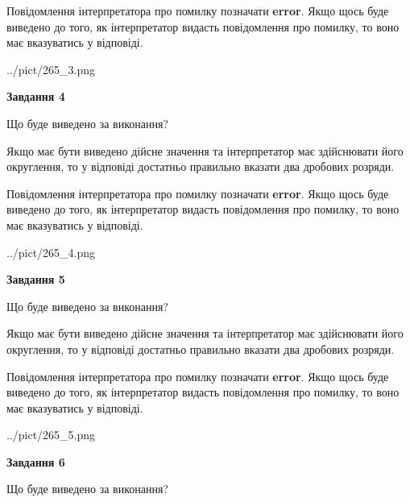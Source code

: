 \documentclass[12pt, ukrainian]{article}
\begin{document}
{\begin {Large}
Повідомлення інтерпретатора про помилку позначати \textbf{error}.
Якщо щось буде виведено до того, як інтерпретатор видасть повідомлення про помилку, 
то воно має вказуватись у відповіді. \par

\begin{center}
	{../pict/265_3.png}
\end{center}
\newpage

{\begin {center}\textbf{Завдання 4}\end {center}}\par
Що буде виведено за виконання? \par

Якщо має бути виведено дійсне значення та інтерпретатор має здійснювати його округлення, 
то у відповіді достатньо правильно вказати два дробових розряди.

Повідомлення інтерпретатора про помилку позначати \textbf{error}.
Якщо щось буде виведено до того, як інтерпретатор видасть повідомлення про помилку, 
то воно має вказуватись у відповіді. \par

\begin{center}
	{../pict/265_4.png}
\end{center}
\newpage

{\begin {center}\textbf{Завдання 5}\end {center}}\par
Що буде виведено за виконання? \par

Якщо має бути виведено дійсне значення та інтерпретатор має здійснювати його округлення, 
то у відповіді достатньо правильно вказати два дробових розряди.

Повідомлення інтерпретатора про помилку позначати \textbf{error}.
Якщо щось буде виведено до того, як інтерпретатор видасть повідомлення про помилку, 
то воно має вказуватись у відповіді. \par

\begin{center}
	{../pict/265_5.png}
\end{center}
\newpage

{\begin {center}\textbf{Завдання 6}\end {center}}\par
Що буде виведено за виконання? \par


\end{Large}}
\end{document}
